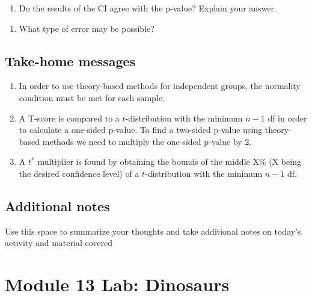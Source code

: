 \documentclass[
]{report}
\providecommand{\tightlist}{%
  \setlength{\itemsep}{0pt}\setlength{\parskip}{0pt}}
\begin{document}
\vspace{0.5in}

\begin{enumerate}
\def\labelenumi{\arabic{enumi}.}
\setcounter{enumi}{14}
\tightlist
\item
  Do the results of the CI agree with the p-value? Explain your answer.
\end{enumerate}

\vspace{0.5in}

\begin{enumerate}
\def\labelenumi{\arabic{enumi}.}
\setcounter{enumi}{15}
\tightlist
\item
  What type of error may be possible?
  \vspace{0.2in}
\end{enumerate}

\hypertarget{take-home-messages-21}{%
\subsection{Take-home messages}\label{take-home-messages-21}}

\begin{enumerate}
\def\labelenumi{\arabic{enumi}.}
\item
  In order to use theory-based methods for independent groups, the normality condition must be met for each sample.
\item
  A T-score is compared to a \(t\)-distribution with the minimum \(n - 1\) df in order to calculate a one-sided p-value. To find a two-sided p-value using theory-based methods we need to multiply the one-sided p-value by 2.
\item
  A \(t^*\) multiplier is found by obtaining the bounds of the middle X\% (X being the desired confidence level) of a \(t\)-distribution with the minimum \(n - 1\) df.
\end{enumerate}

\hypertarget{additional-notes-21}{%
\subsection{Additional notes}\label{additional-notes-21}}

Use this space to summarize your thoughts and take additional notes on today's activity and material covered

\vspace{3in}
\newpage

\hypertarget{module-13-lab-dinosaurs}{%
\section{Module 13 Lab: Dinosaurs}\label{module-13-lab-dinosaurs}}
\end{document}
